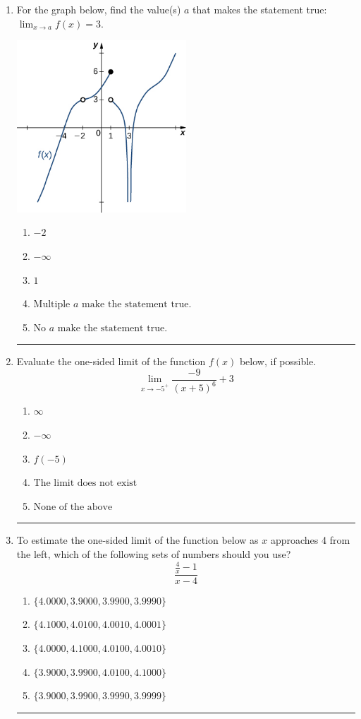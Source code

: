 \documentclass[14pt]{extbook}
\newcommand{\litem}[1]{\item#1\hspace*{-1cm}\rule{\textwidth}{0.4pt}}
\begin{document}
\begin{enumerate}
{\begin{enumerate}[label=\Alph*.]
\end{enumerate} }
\litem{
For the graph below, find the value(s) $a$ that makes the statement true: $ \displaystyle \lim_{x \rightarrow a} f(x) = 3$.
\begin{center}
    \includegraphics[width=0.5\textwidth]{../Figures/evaluateLimitGraphicallyC.png}
\end{center}
\begin{enumerate}[label=\Alph*.]
\item \( -2 \)
\item \( -\infty \)
\item \( 1 \)
\item \( \text{Multiple } a \text{ make the statement true}. \)
\item \( \text{No } a \text{ make the statement true}. \)

\end{enumerate} }
\litem{
Evaluate the one-sided limit of the function $f(x)$ below, if possible.\[ \lim_{x \rightarrow -5^+} \frac{-9}{(x+5)^6}+3 \]\begin{enumerate}[label=\Alph*.]
\item \( \infty \)
\item \( -\infty \)
\item \( f(-5) \)
\item \( \text{The limit does not exist} \)
\item \( \text{None of the above} \)

\end{enumerate} }
\litem{
To estimate the one-sided limit of the function below as $x$ approaches 4 from the left, which of the following sets of numbers should you use?\[ \frac{\frac{4}{x} - 1}{x - 4} \]\begin{enumerate}[label=\Alph*.]
\item \( \{ 4.0000, 3.9000, 3.9900, 3.9990 \} \)
\item \( \{ 4.1000, 4.0100, 4.0010, 4.0001 \} \)
\item \( \{ 4.0000, 4.1000, 4.0100, 4.0010 \} \)
\item \( \{ 3.9000, 3.9900, 4.0100, 4.1000 \} \)
\item \( \{ 3.9000, 3.9900, 3.9990, 3.9999 \} \)


\end{enumerate}}
\end{enumerate}
\end{document}
